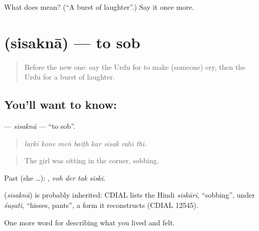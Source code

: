 \begin{tcolorbox}[breakable,colback=teal!4,colframe=teal!35!black,title={Before you move on}]
What does  mean? (\textquotedblleft{}A burst of laughter\textquotedblright{}.) Say it once more.
\end{tcolorbox}
\section[\texorpdfstring{\ur{سسکنا} (sisaknā)}{سسکنا (sisaknā)}]{ (sisaknā) — to sob}

\label{lesson:UR-C453-sisakna}



\begin{quote}
Before the new one: say the Urdu for to make (someone) cry, then the Urdu for a burst of laughter.
\end{quote}

\subsection*{You'll want to know: }
\textbf{} — \emph{sisaknā} — \textquotedblleft{}to sob\textquotedblright{}.

\begin{quote}
       
\end{quote}

\begin{quote}
\emph{laṛkī kone meṅ baiṭh kar sisak rahī thī.}
\end{quote}

\begin{quote}
The girl was sitting in the corner, sobbing.
\end{quote}

Past (she …):    , \emph{voh der tak siskī}.

\begin{cousinweb}
\textbf{} (\emph{sisaknā}) is probably inherited: CDIAL lists the Hindi \emph{siskārī}, \textquotedblleft{}sobbing\textquotedblright{}, under \emph{śuṣati}, \textquotedblleft{}hisses, pants\textquotedblright{}, a form it reconstructs (CDIAL 12545).
\end{cousinweb}

\begin{grammarlens}[title={What you've built}]
One more word for describing what you lived and felt.
\end{grammarlens}

